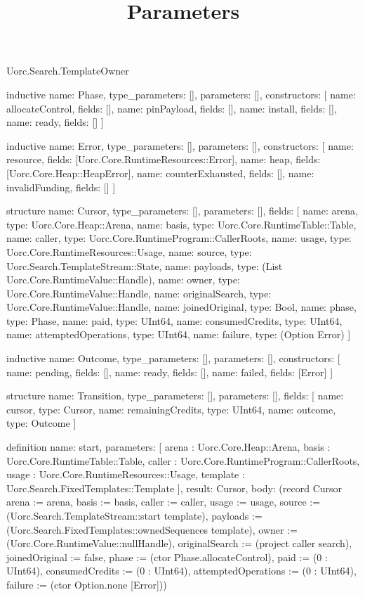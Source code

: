 \begin{lexlean}{Uorc.Search.TemplateOwner}
\title{Parameters}
\begin{semanticmodule}
inductive{
  name: Phase,
  type_parameters: [],
  parameters: [],
  constructors: [
    {name: allocateControl, fields: []},
    {name: pinPayload, fields: []},
    {name: install, fields: []},
    {name: ready, fields: []}
  ]
}

inductive{
  name: Error,
  type_parameters: [],
  parameters: [],
  constructors: [
    {name: resource, fields: [Uorc.Core.RuntimeResources::Error]},
    {name: heap, fields: [Uorc.Core.Heap::HeapError]},
    {name: counterExhausted, fields: []},
    {name: invalidFunding, fields: []}
  ]
}

structure{
  name: Cursor,
  type_parameters: [],
  parameters: [],
  fields: [
    {name: arena, type: Uorc.Core.Heap::Arena},
    {name: basis, type: Uorc.Core.RuntimeTable::Table},
    {name: caller, type: Uorc.Core.RuntimeProgram::CallerRoots},
    {name: usage, type: Uorc.Core.RuntimeResources::Usage},
    {name: source, type: Uorc.Search.TemplateStream::State},
    {name: payloads, type: (List Uorc.Core.RuntimeValue::Handle)},
    {name: owner, type: Uorc.Core.RuntimeValue::Handle},
    {name: originalSearch, type: Uorc.Core.RuntimeValue::Handle},
    {name: joinedOriginal, type: Bool},
    {name: phase, type: Phase},
    {name: paid, type: UInt64},
    {name: consumedCredits, type: UInt64},
    {name: attemptedOperations, type: UInt64},
    {name: failure, type: (Option Error)}
  ]
}

inductive{
  name: Outcome,
  type_parameters: [],
  parameters: [],
  constructors: [
    {name: pending, fields: []},
    {name: ready, fields: []},
    {name: failed, fields: [Error]}
  ]
}

structure{
  name: Transition,
  type_parameters: [],
  parameters: [],
  fields: [
    {name: cursor, type: Cursor},
    {name: remainingCredits, type: UInt64},
    {name: outcome, type: Outcome}
  ]
}

definition{
  name: start,
  parameters: [
    arena : Uorc.Core.Heap::Arena,
    basis : Uorc.Core.RuntimeTable::Table,
    caller : Uorc.Core.RuntimeProgram::CallerRoots,
    usage : Uorc.Core.RuntimeResources::Usage,
    template : Uorc.Search.FixedTemplates::Template
  ],
  result: Cursor,
  body: (record Cursor {arena := arena, basis := basis, caller := caller, usage := usage, source := (Uorc.Search.TemplateStream::start template), payloads := (Uorc.Search.FixedTemplates::ownedSequences template), owner := (Uorc.Core.RuntimeValue::nullHandle), originalSearch := (project caller search), joinedOriginal := false, phase := (ctor Phase.allocateControl), paid := (0 : UInt64), consumedCredits := (0 : UInt64), attemptedOperations := (0 : UInt64), failure := (ctor Option.none [Error])})
}


\end{semanticmodule}
\end{lexlean}
